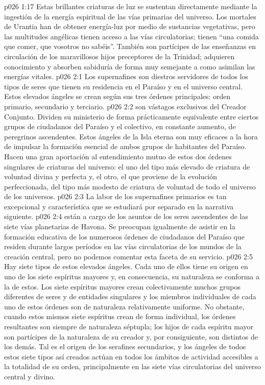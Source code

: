 \vs p026 1:17 Estas brillantes criaturas de luz se sustentan directamente mediante la ingestión de la energía espiritual de las vías primarias del universo. Los mortales de Urantia han de obtener energía\hyp{}luz por medio de sustancias vegetativas, pero las multitudes angélicas tienen acceso a las vías circulatorias; tienen “una comida que comer, que vosotros no sabéis”. También son partícipes de las enseñanzas en circulación de los maravillosos hijos preceptores de la Trinidad; adquieren conocimiento y absorben sabiduría de forma muy semejante a como asimilan las energías vitales.
\vs p026 2:1 Los supernafines son diestros servidores de todos los tipos de seres que tienen su residencia en el Paraíso y en el universo central. Estos elevados ángeles se crean según sus tres órdenes principales: orden primario, secundario y terciario.
\vs p026 2:2 \pc {} son vástagos exclusivos del Creador Conjunto. Dividen su ministerio de forma prácticamente equivalente entre ciertos grupos de ciudadanos del Paraíso y el colectivo, en constante aumento, de peregrinos ascendentes. Estos ángeles de la Isla eterna son muy eficaces a la hora de impulsar la formación esencial de ambos grupos de habitantes del Paraíso. Hacen una gran aportación al entendimiento mutuo de estos dos órdenes singulares de criaturas del universo: el uno del tipo más elevado de criatura de voluntad divina y perfecta y, el otro, el que proviene de la evolución perfeccionada, del tipo más modesto de criatura de voluntad de todo el universo de los universos.
\vs p026 2:3 \pc La labor de los supernafines primarios es tan excepcional y característica que se estudiará por separado en la narrativa siguiente.
\vs p026 2:4 \pc {} están a cargo de los asuntos de los seres ascendentes de las siete vías planetarias de Havona. Se preocupan igualmente de asistir en la formación educativa de los numerosos órdenes de ciudadanos del Paraíso que residen durante largos períodos en las vías circulatorias de los mundos de la creación central, pero no podemos comentar esta faceta de su servicio.
\vs p026 2:5 \pc Hay siete tipos de estos elevados ángeles. Cada uno de ellos tiene su origen en uno de los siete espíritus mayores y, en consecuencia, su naturaleza se conforma a la de estos. Los siete espíritus mayores crean colectivamente muchos grupos diferentes de seres y de entidades singulares y los miembros individuales de cada uno de estos órdenes son de naturaleza relativamente uniforme. No obstante, cuando estos mismos siete espíritus crean de forma individual, los órdenes resultantes son siempre de naturaleza séptupla; los hijos de cada espíritu mayor son partícipes de la naturaleza de su creador y, por consiguiente, son distintos de los demás. Tal es el origen de los serafines secundarios, y los ángeles de todos estos siete tipos así creados actúan en todos los ámbitos de actividad accesibles a la totalidad de su orden, principalmente en las siete vías circulatorias del universo central y divino.
